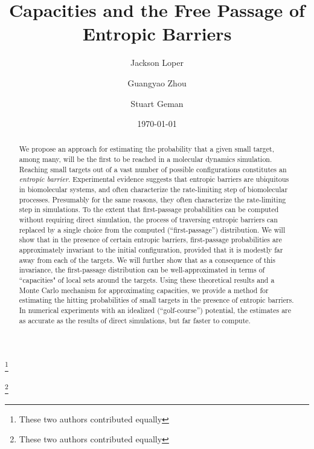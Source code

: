\documentclass[nofootinbib,english, aip, jcp, priprint, graphicx,floatfix]{revtex4-1}
\theoremstyle{plain}
\theoremstyle{definition}
\theoremstyle{plain}
\begin{document}
\title{Capacities and the Free Passage of Entropic Barriers} %

\author{Jackson Loper}
\thanks{These two authors contributed equally}

\author{Guangyao Zhou}
\thanks{These two authors contributed equally}

\author{Stuart Geman}

\date{\today}

\begin{abstract}
	We propose an approach for estimating the probability that a given small target, among many, will be the first to be reached in a molecular dynamics simulation. Reaching small targets out of a vast number of possible configurations constitutes an \emph{entropic barrier}. Experimental evidence suggests that entropic barriers are ubiquitous in biomolecular systems, and often characterize the rate-limiting step of biomolecular processes. Presumably for the same reasons, they often characterize the rate-limiting step in simulations. To the extent that first-passage probabilities can be computed without requiring direct simulation, the process of traversing entropic barriers can replaced by a single choice from the computed (``first-passage'') distribution.
We will show that in the presence of certain entropic barriers, first-passage probabilities are approximately invariant to the initial configuration, provided that it is modestly far away from each of the targets.  We will further show that as a consequence of this 
invariance, the first-passage distribution can be well-approximated in terms of ``capacities" of local sets around the targets.  Using these theoretical results and a Monte Carlo mechanism for
approximating capacities, we provide a method for estimating the  hitting probabilities of small targets in the presence of entropic barriers. In numerical experiments with an
idealized (``golf-course'') potential, the estimates are as accurate as the results of direct simulations, but far faster to compute.
\end{abstract}

\pacs{}%

\maketitle %
\end{document}
